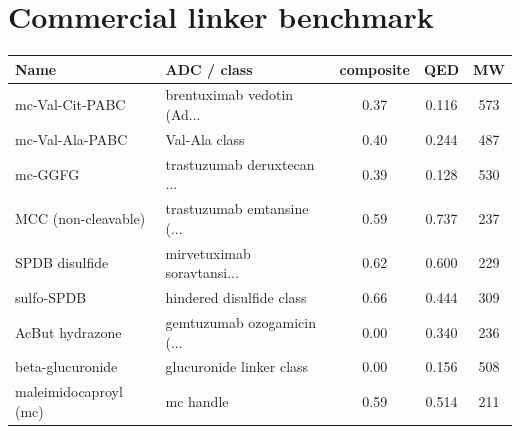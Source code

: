 \documentclass[10pt]{article}
\begin{document}
\section{Commercial linker benchmark}
\begin{longtable}{l l c c c}\toprule
Name & ADC / class & composite & QED & MW \\ \midrule\endhead
mc-Val-Cit-PABC & brentuximab vedotin (Ad... & 0.37 & 0.116 & 573 \\
mc-Val-Ala-PABC & Val-Ala class & 0.40 & 0.244 & 487 \\
mc-GGFG & trastuzumab deruxtecan ... & 0.39 & 0.128 & 530 \\
MCC (non-cleavable) & trastuzumab emtansine (... & 0.59 & 0.737 & 237 \\
SPDB disulfide & mirvetuximab soravtansi... & 0.62 & 0.600 & 229 \\
sulfo-SPDB & hindered disulfide class & 0.66 & 0.444 & 309 \\
AcBut hydrazone & gemtuzumab ozogamicin (... & 0.00 & 0.340 & 236 \\
beta-glucuronide & glucuronide linker class & 0.00 & 0.156 & 508 \\
maleimidocaproyl (mc) & mc handle & 0.59 & 0.514 & 211 \\
\bottomrule\end{longtable}
\end{document}
